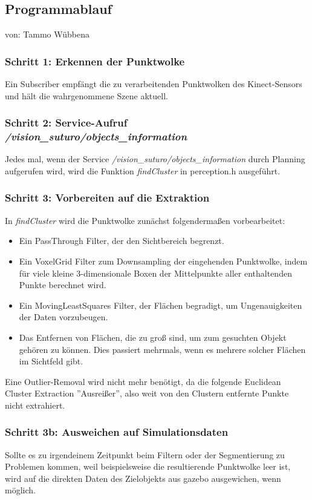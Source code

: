 \documentclass{suturo}
\makeatletter
\newcommand{\chapterauthor}[1]{%
  {\parindent0pt\vspace*{-27pt}%
  \linespread{0}\small\begin{flushright}von: #1\end{flushright}%
  \par\nobreak\vspace*{0pt}}
  \@afterheading%
}
\makeatother
\begin{document}
\subsection{Programmablauf}
\chapterauthor{Tammo Wübbena}
\subsubsection{Schritt 1: Erkennen der Punktwolke}
Ein Subscriber empfängt die zu verarbeitenden Punktwolken des Kinect-Sensors und hält die wahrgenommene Szene aktuell.
\subsubsection{Schritt 2: Service-Aufruf \textit{/vision\_suturo/objects\_information}}
Jedes mal, wenn der Service \textit{/vision\_suturo/objects\_information} durch Planning aufgerufen wird, wird die Funktion \textit{findCluster} in perception.h ausgeführt. 
\subsubsection{Schritt 3: Vorbereiten auf die Extraktion} 
In \textit{findCluster} wird die Punktwolke zunächst folgendermaßen vorbearbeitet:

\begin{itemize} 
\item Ein PassThrough Filter, der den Sichtbereich begrenzt.
\item Ein VoxelGrid Filter zum Downsampling der eingehenden Punktwolke, indem für viele kleine 3-dimensionale Boxen der Mittelpunkte aller enthaltenden Punkte berechnet wird.
\item Ein MovingLeastSquares Filter, der Flächen begradigt, um Ungenauigkeiten der Daten vorzubeugen.
\item Das Entfernen von Flächen, die zu groß sind, um zum gesuchten Objekt gehören zu können. Dies passiert mehrmals, wenn es mehrere solcher Flächen im Sichtfeld gibt.
\end{itemize}
Eine Outlier-Removal wird nicht mehr benötigt, da die folgende Euclidean Cluster Extraction ''Ausreißer'', also weit von den Clustern entfernte Punkte nicht extrahiert.\\
\subsubsection{Schritt 3b: Ausweichen auf Simulationsdaten}
Sollte es zu irgendeinem Zeitpunkt beim Filtern oder der Segmentierung zu Problemen kommen, weil beispielsweise die resultierende Punktwolke leer ist, wird auf die direkten Daten des Zielobjekts aus gazebo ausgewichen, wenn möglich.
\\
\end{document}
